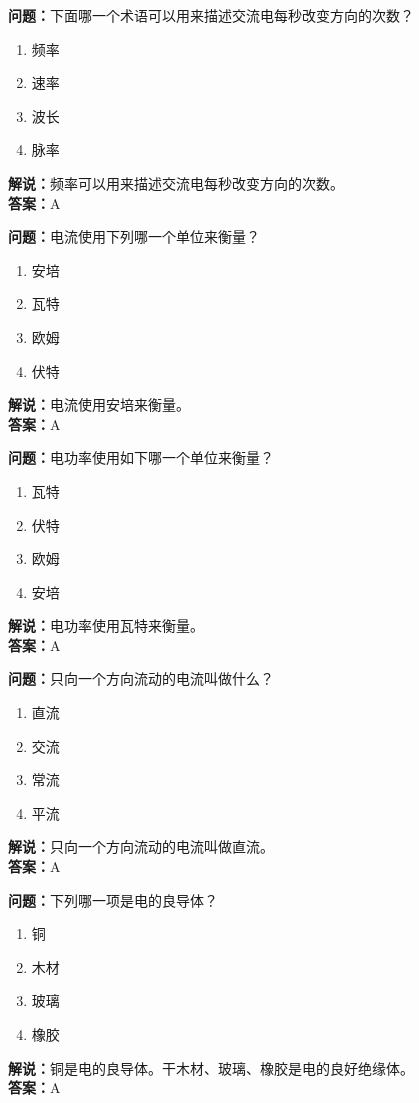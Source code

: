 \documentclass{ctexbook}%
\begin{document}
\textbf{问题：}下面哪一个术语可以用来描述交流电每秒改变方向的次数？
\begin{enumerate}[label=\Alph*), leftmargin=3em]
\item 频率
\item 速率
\item 波长
\item 脉率
\end{enumerate}
\textbf{解说：}频率可以用来描述交流电每秒改变方向的次数。\\
\textbf{答案：}A

\textbf{问题：}电流使用下列哪一个单位来衡量？
\begin{enumerate}[label=\Alph*), leftmargin=3em]
\item 安培
\item 瓦特
\item 欧姆
\item 伏特
\end{enumerate}
\textbf{解说：}电流使用安培来衡量。\\
\textbf{答案：}A

\textbf{问题：}电功率使用如下哪一个单位来衡量？
\begin{enumerate}[label=\Alph*), leftmargin=3em]
\item 瓦特
\item 伏特
\item 欧姆
\item 安培
\end{enumerate}
\textbf{解说：}电功率使用瓦特来衡量。\\
\textbf{答案：}A

\textbf{问题：}只向一个方向流动的电流叫做什么？
\begin{enumerate}[label=\Alph*), leftmargin=3em]
\item 直流
\item 交流
\item 常流
\item 平流
\end{enumerate}
\textbf{解说：}只向一个方向流动的电流叫做直流。\\
\textbf{答案：}A

\textbf{问题：}下列哪一项是电的良导体？
\begin{enumerate}[label=\Alph*), leftmargin=3em]
\item 铜
\item 木材
\item 玻璃
\item 橡胶
\end{enumerate}
\textbf{解说：}铜是电的良导体。干木材、玻璃、橡胶是电的良好绝缘体。\\
\textbf{答案：}A
\end{document}
